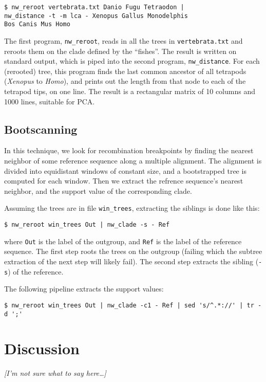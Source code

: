 \documentclass{bioinfo}
\newcommand{\prog}[1]{\texttt{nw\_#1}}
\begin{document}
\begin{verbatim}
$ nw_reroot vertebrata.txt Danio Fugu Tetraodon | 
nw_distance -t -m lca - Xenopus Gallus Monodelphis
Bos Canis Mus Homo 
\end{verbatim}

The first program, \prog{reroot}, reads in all the trees in \texttt{vertebrata.txt} and reroots them on the clade defined by the ``fishes''. The result is written on standard output, which is piped into the second program, \prog{distance}. For each (rerooted) tree, this program finds the last common ancestor of all tetrapods (\textit{Xenopus} to \textit{Homo}), and prints out the length from that node to each of the tetrapod tips, on one line. The result is a rectangular matrix of 10 columns and 1000 lines, suitable for \textsc{PCA}.

\subsection*{Bootscanning}

In this technique, we look for recombination breakpoints by finding the nearest neighbor of some reference sequence along a multiple alignment. The alignment is divided into equidistant windows of constant size, and a bootstrapped tree is computed for each window. Then we extract the refrence sequence's nearest neighbor, and the support value of the corresponding clade.

Assuming the trees are in file \verb|win_trees|, extracting the siblings is done like this:
\begin{verbatim}
$ nw_reroot win_trees Out | nw_clade -s - Ref 
\end{verbatim}
where \texttt{Out} is the label of the outgroup, and \texttt{Ref} is the label of the reference sequence. The first step roots the trees on the outgroup (failing which the subtree extraction of the next step will likely fail). The second step extracts the sibling (\texttt{-s}) of the reference. 

The following pipeline extracts the support values:
\begin{verbatim}
$ nw_reroot win_trees Out | nw_clade -c1 - Ref | sed 's/^.*://' | tr -d ';'
\end{verbatim}

\section{Discussion}

\emph{[I'm not sure what to say here\ldots]}
\end{document}

